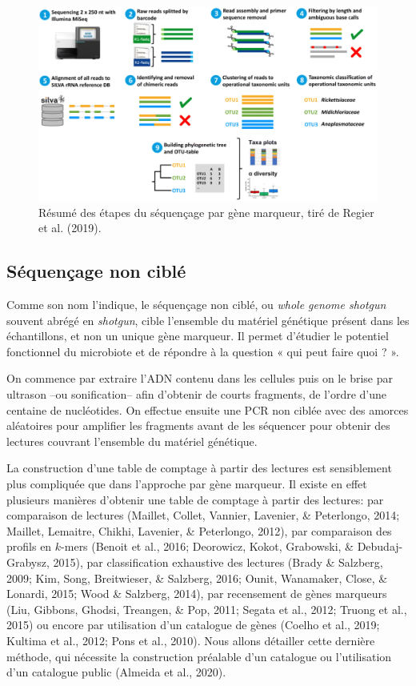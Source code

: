 \documentclass[12pt,a4paper]{reedthesis}
\theoremstyle{definition}
\theoremstyle{definition}
\theoremstyle{definition}
\theoremstyle{remark}
\begin{document}
\begin{figure}[!t]

{\centering \includegraphics[width=0.9\linewidth]{img/16s} 

}

\caption{Résumé des étapes du séquençage par gène marqueur, tiré de Regier et al. (2019).}\label{fig:16s}
\end{figure}
\hypertarget{suxe9quenuxe7age-non-cibluxe9}{%
\subsection{Séquençage non ciblé}\label{suxe9quenuxe7age-non-cibluxe9}}

Comme son nom l'indique, le séquençage non ciblé, ou \emph{whole genome shotgun} souvent abrégé en \emph{shotgun}, cible l'ensemble du matériel génétique présent dans les échantillons, et non un unique gène marqueur. Il permet d'étudier le potentiel fonctionnel du microbiote et de répondre à la question « qui peut faire quoi ? ».

On commence par extraire l'ADN contenu dans les cellules puis on le brise par ultrason --ou sonification-- afin d'obtenir de courts fragments, de l'ordre d'une centaine de nucléotides. On effectue ensuite une PCR non ciblée avec des amorces aléatoires pour amplifier les fragments avant de les séquencer pour obtenir des lectures couvrant l'ensemble du matériel génétique.

La construction d'une table de comptage à partir des lectures est sensiblement plus compliquée que dans l'approche par gène marqueur. Il existe en effet plusieurs manières d'obtenir une table de comptage à partir des lectures: par comparaison de lectures (Maillet, Collet, Vannier, Lavenier, \& Peterlongo, 2014; Maillet, Lemaitre, Chikhi, Lavenier, \& Peterlongo, 2012), par comparaison des profils en \(k\)-mers (Benoit et al., 2016; Deorowicz, Kokot, Grabowski, \& Debudaj-Grabysz, 2015), par classification exhaustive des lectures (Brady \& Salzberg, 2009; Kim, Song, Breitwieser, \& Salzberg, 2016; Ounit, Wanamaker, Close, \& Lonardi, 2015; Wood \& Salzberg, 2014), par recensement de gènes marqueurs (Liu, Gibbons, Ghodsi, Treangen, \& Pop, 2011; Segata et al., 2012; Truong et al., 2015) ou encore par utilisation d'un catalogue de gènes (Coelho et al., 2019; Kultima et al., 2012; Pons et al., 2010). Nous allons détailler cette dernière méthode, qui nécessite la construction préalable d'un catalogue ou l'utilisation d'un catalogue public (Almeida et al., 2020).
\end{document}
